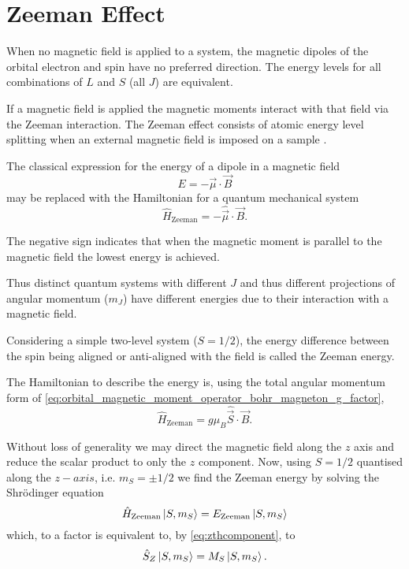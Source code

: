 \section{Zeeman Effect}\label{zeeman}
When no magnetic field is applied to a system, the magnetic dipoles of the orbital electron and spin have no preferred direction. 
The energy levels for all combinations of $L$ and $S$ (all $J$) are equivalent. 

If a magnetic field is applied the magnetic moments interact with that field via the Zeeman interaction. 
The Zeeman effect consists of atomic energy level splitting when an external magnetic field is imposed on a sample \cite{Nabokov2002}. 

The classical expression for the energy of a dipole in a magnetic field
\begin{equation}
    E = -\vec{\mu}\cdot\vec{B}
    \label{eq:}
\end{equation}
may be replaced with the Hamiltonian for a quantum mechanical system 
\begin{equation}
    \hat{H}_{\text{Zeeman}} = - \hat{\vec{\mu}}\cdot \vec{B}. 
    \label{eq:}
\end{equation}

The negative sign indicates that when the magnetic moment is parallel to the magnetic field the lowest energy is achieved. 

Thus distinct quantum systems with different $J$ and thus different projections of angular momentum ($m_J$) have different energies due to their interaction with a magnetic field. 

Considering a simple two-level system ($S=1/2$), the energy difference between the spin being aligned or anti-aligned with the field is called the Zeeman energy. 

The Hamiltonian to describe the energy is, using the total angular momentum form of \ref{eq:orbital_magnetic_moment_operator_bohr_magneton_g_factor}, 
\begin{equation}
    \hat{H}_{\text{Zeeman}} = g \mu_B \hat{\vec{S}}\cdot\vec{B}. 
    \label{eq:}
\end{equation}

Without loss of generality we may direct the magnetic field along the $z$ axis and reduce the scalar product to only the $z$ component. Now, using $S=1/2$ quantised along the $z-axis$, i.e. $m_S = \pm 1/2$ we find the Zeeman energy by solving the Shr\"odinger equation 
\begin{equation}
    \hat{H}_{\text{Zeeman}} \ket{S, m_S} = E_{\text{Zeeman}}\ket{S, m_S} 
\end{equation}
which, to a factor is equivalent to, by \ref{eq:zthcomponent}, to
\begin{equation}
    \hat{S}_{Z} \ket{S, m_S} = M_S\ket{S, m_S}.
\end{equation}

